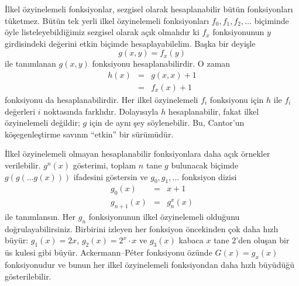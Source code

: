 


İlkel özyinelemeli fonksiyonlar, sezgisel olarak hesaplanabilir bütün
fonksiyonları tüketmez. Bütün tek yerli ilkel özyinelemeli fonksiyonları
$f_0,f_1,f_2,\dots$ biçiminde öyle listeleyebildiğimiz sezgisel olarak açık
olmalıdır ki $f_x$ fonksiyonunun $y$ girdisindeki değerini etkin biçimde
hesaplayabilelim. Başka bir deyişle
\[
  g(x,y)=f_x(y)
\]
ile tanımlanan $g(x,y)$ fonksiyonu hesaplanabilirdir. O zaman
\begin{eqnarray*}
  h(x) & = & g(x,x)+1\\
       & = & f_x(x)+1
\end{eqnarray*}
fonksiyonu da hesaplanabilirdir. Her ilkel özyinelemeli $f_i$ fonksiyonu
için $h$ ile $f_i$ değerleri $i$ noktasında farklıdır. Dolayısıyla $h$
hesaplanabilir, fakat ilkel özyinelemeli değildir; $g$ için de aynı şey
söylenebilir. Bu, Cantor'un köşegenleştirme savının ``etkin'' bir sürümüdür.

İlkel özyinelemeli olmayan hesaplanabilir fonksiyonlara daha açık örnekler
verilebilir. $g^n(x)$ gösterimi, toplam $n$ tane $g$ bulunacak biçimde
$g(g(\dots g(x)))$ ifadesini göstersin ve $g_0,g_1,\dots$ fonksiyon dizisi
\begin{eqnarray*}
  g_0(x) & = & x+1\\
  g_{n+1}(x) & = & g_n^x(x)
\end{eqnarray*}
ile tanımlansın. Her $g_n$ fonksiyonunun ilkel özyinelemeli olduğunu
doğrulayabilirsiniz. Birbirini izleyen her fonksiyon öncekinden çok daha hızlı
büyür: $g_1(x)=2x$, $g_2(x)=2^x\cdot x$ ve $g_3(x)$ kabaca $x$ tane $2$'den
oluşan bir üs kulesi gibi büyür. Ackermann--P\'eter fonksiyonu özünde
$G(x)=g_x(x)$ fonksiyonudur ve bunun her ilkel özyinelemeli fonksiyondan daha
hızlı büyüdüğü gösterilebilir.

